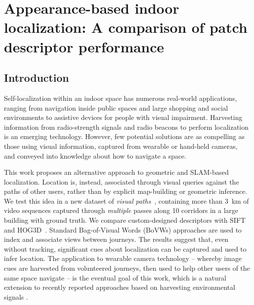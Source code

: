 \chapter{Appearance-based indoor localization: A comparison of patch descriptor performance}\label{ch:chapter4} %

\section{Introduction}
\label{sec:intro}

Self-localization within an indoor space has numerous real-world 
applications, ranging from navigation inside public spaces and large shopping and social environments to
 assistive devices for people with visual impairment.   Harvesting information from 
radio-strength signals and radio beacons to perform localization is an emerging technology.  
However, few potential solutions are as compelling as those using  visual information, 
 captured from wearable or hand-held cameras, and conveyed into knowledge about how 
to navigate a space. 

\indent This work proposes an alternative approach to geometric and SLAM-based 
localization.  Location is, instead, associated through visual queries against the
 paths of other users, rather than by explicit map-building or geometric inference. 
We test this idea  in a new dataset of \emph{visual paths}~\cite{Rivera-Rubio2014}, 
containing  more than \SI{3}{km} of video sequences captured through {\em multiple} passes 
along 10 corridors  in a large building with ground truth. We compare custom-designed 
descriptors  with SIFT~\cite{Lowe2004} and HOG3D~\cite{Klaser2008}.  Standard Bag-of-Visual Words (BoVWs) approaches are used to index and associate views between journeys. The results suggest that, even without tracking, significant cues about localization can be captured and used to infer location.  The application to wearable camera technology -- whereby image cues are harvested from volunteered 
journeys, then used to help other users of the same space navigate -- is the eventual
 goal of this work, which is a natural extension to recently reported approaches based on harvesting environmental signals \cite{Wang2012}.



